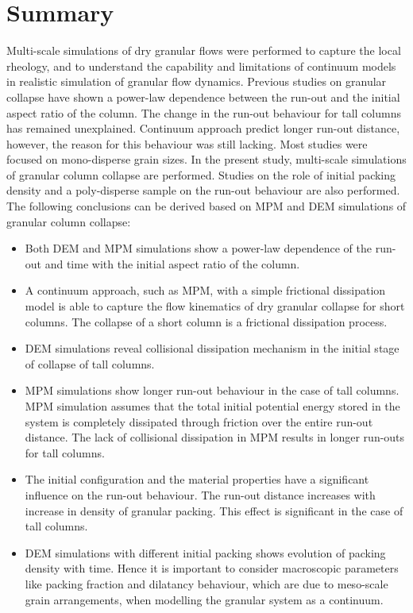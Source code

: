 
\section{Summary}

Multi-scale simulations of dry granular flows were performed to capture the 
local rheology, and to understand the capability and limitations of continuum 
models in realistic simulation of granular flow dynamics. Previous studies on 
granular collapse have shown a power-law dependence between the run-out and the 
initial aspect ratio of the column. The change in the run-out behaviour for 
tall columns has remained unexplained. Continuum approach predict longer 
run-out distance, however, the reason for this behaviour was still lacking. 
Most studies were focused on mono-disperse grain sizes. In the present study, 
multi-scale simulations of granular column collapse are performed. Studies on 
the role of initial packing density and a poly-disperse sample on the run-out 
behaviour are also performed. The following conclusions can be derived based on 
MPM and DEM simulations of granular column collapse:

\begin{itemize}

\item Both DEM and MPM simulations show a power-law dependence of the run-out 
and time with the initial aspect ratio of the column. 

\item A continuum approach, such as MPM, with a simple frictional dissipation 
model is able to capture the flow kinematics of dry granular collapse for short 
columns. The collapse of a short column is a frictional dissipation process.

\item DEM simulations reveal collisional dissipation mechanism in the initial 
stage of collapse of tall columns. 

\item MPM simulations show longer run-out behaviour in the case 
of tall columns. MPM simulation assumes that the total initial potential energy 
stored in the system is completely dissipated through friction over the entire 
run-out distance. The lack of collisional dissipation in MPM results in longer 
run-outs for tall columns.

\item  The initial configuration and the material properties have a significant 
influence on the run-out behaviour. The run-out distance increases with 
increase in density of granular packing. This effect is significant in the case 
of tall columns. 

\item DEM simulations with different initial packing shows evolution of packing 
density with time.  Hence it is important to consider macroscopic parameters 
like packing fraction and dilatancy behaviour, which are due to meso-scale 
grain arrangements, when modelling the granular system as a continuum.
\end{itemize}

